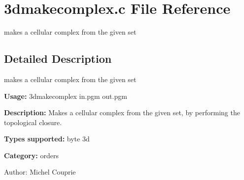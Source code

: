 \section{3dmakecomplex.c File Reference}
\label{3dmakecomplex_8c}
makes a cellular complex from the given set 



\subsection{Detailed Description}
makes a cellular complex from the given set 

{\bf Usage:} 3dmakecomplex in.pgm out.pgm

{\bf Description:} Makes a cellular complex from the given set, by performing the topological closure.

{\bf Types supported:} byte 3d

{\bf Category:} orders

\begin{Desc}
\item[Author:]Michel Couprie \end{Desc}
